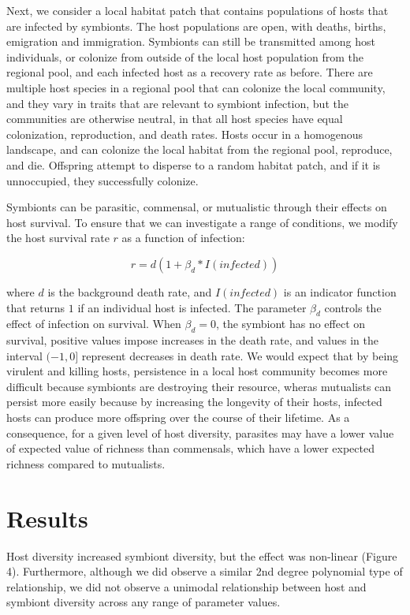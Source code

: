 \documentclass[12pt]{article}
\begin{document}
Next, we consider a local habitat patch that contains populations of hosts that are infected by symbionts. 
The host populations are open, with deaths, births, emigration and immigration.
Symbionts can still be transmitted among host individuals, or colonize from outside of the local host population from the regional pool, and each infected host as a recovery rate as before. 
There are multiple host species in a regional pool that can colonize the local community, and they vary in traits that are relevant to symbiont infection, but the communities are otherwise neutral, in that all host species have equal colonization, reproduction, and death rates. 
Hosts occur in a homogenous landscape, and can colonize the local habitat from the regional pool, reproduce, and die. 
Offspring attempt to disperse to a random habitat patch, and if it is unnoccupied, they successfully colonize.

Symbionts can be parasitic, commensal, or mutualistic through their effects on host survival.
To ensure that we can investigate a range of conditions, we modify the host survival rate $r$ as a function of infection:

$$r = d(1 + \beta_d * I(infected))$$

where $d$ is the background death rate, and $I(infected)$ is an indicator function that returns $1$ if an individual host is infected. 
The parameter $\beta_d$ controls the effect of infection on survival. 
When $\beta_d = 0$, the symbiont has no effect on survival, positive values impose increases in the death rate, and values in the interval $(-1, 0]$ represent decreases in death rate. 
We would expect that by being virulent and killing hosts, persistence in a local host community becomes more difficult because symbionts are destroying their resource, wheras mutualists can persist more easily because by increasing the longevity of their hosts, infected hosts can produce more offspring over the course of their lifetime.
As a consequence, for a given level of host diversity, parasites may have a lower value of expected value of richness than commensals, which have a lower expected richness compared to mutualists. 

\section{Results}

Host diversity increased symbiont diversity, but the effect was non-linear (Figure 4). 
Furthermore, although we did observe a similar 2nd degree polynomial type of relationship, we did not observe a unimodal relationship between host and symbiont diversity across any range of parameter values. 
\end{document}

